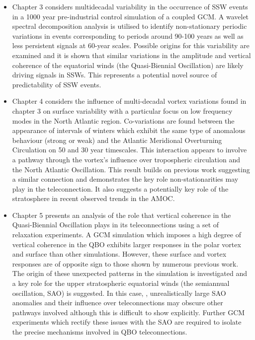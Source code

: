 \begin{itemize}
    \item Chapter 3 considers multidecadal variability in the occurrence of SSW events in a 1000 year pre-industrial control simulation of a coupled GCM. A wavelet spectral decomposition analysis is utilised to identify non-stationary periodic variations in events corresponding to periods around 90-100 years as well as less persistent signals at 60-year scales. Possible origins for this variability are examined and it is shown that similar variations in the amplitude and vertical coherence of the equatorial winds (the Quasi-Biennial Oscillation) are likely driving signals in SSWs. This represents a potential novel source of predictability of SSW events.
    
    \item Chapter 4 considers the influence of multi-decadal vortex variations found in chapter 3 on surface variability with a particular focus on low frequency modes in the North Atlantic region. Co-variations are found between the appearance of intervals of winters which exhibit the same type of anomalous behaviour (strong or weak) and the Atlantic Meridional Overturning Circulation on 50 and 30 year timescales. This interaction appears to involve a pathway through the vortex's influence over tropospheric circulation and the North Atlantic Oscillation. This result builds on previous work suggesting a similar connection and demonstrates the key role non-stationarities may play in the teleconnection. It also suggests a potentially key role of the stratosphere in recent observed trends in the AMOC. 
    
    \item Chapter 5 presents an analysis of the role that vertical coherence in the Quasi-Biennial Oscillation plays in its teleconnections using a set of relaxation experiments. A GCM simulation which imposes a high degree of vertical coherence in the QBO exhibits larger responses in the polar vortex and surface than other simulations. However, these surface and vortex responses are of opposite sign to those shown by numerous previous work. The origin of these unexpected patterns in the simulation is investigated and a key role for the upper stratospheric equatorial winds (the semiannual oscillation, SAO) is suggested. In this case, , unrealistically large SAO anomalies and their influence over teleconnections may obscure other pathways involved although this is difficult to show explicitly. Further GCM experiments which rectify these issues with the SAO are required to isolate the precise mechanisms involved in QBO teleconnections.  
\end{itemize}


